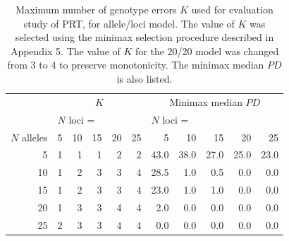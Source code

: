 \documentclass[twoside,10pt,twocolumn]{article}
\begin{document}
\begin{table}
\caption{Maximum number of genotype errors $K$ used for evaluation study of PRT, for allele/loci model. The 
value of $K$ was selected using the minimax selection procedure described in Appendix 5. The value of $K$ 
for the 20/20 model was changed from 3 to 4 to preserve monotonicity. The minimax median $PD$ is also 
listed.}\label{k.table}
\centering
\begin{tabular}{r|rrrrr|rrrrr} \hline
  & \multicolumn{5}{c|}{$K$} & \multicolumn{5}{c}{Minimax median $PD$} \\
 & \multicolumn{5}{l|}{$N$ loci =} & \multicolumn{5}{l}{$N$ loci =} \\
$N$ alleles  & 5 & 10 & 15 & 20 & 25 & 5 & 10 & 15 & 20 & 25 \\ 
  \hline
5 & 1 & 1 & 1 & 2 & 2 & 43.0 & 38.0 & 27.0 & 25.0 & 23.0 \\ 
  10 & 1 & 2 & 3 & 3 & 4 & 28.5 & 1.0 & 0.5 & 0.0 & 0.0 \\ 
  15 & 1 & 2 & 3 & 3 & 4 & 23.0 & 1.0 & 1.0 & 0.0 & 0.0 \\ 
  20 & 1 & 3 & 3 & 4 & 4 & 2.0 & 0.0 & 0.0 & 0.0 & 0.0 \\ 
  25 & 2 & 3 & 3 & 4 & 4 & 0.0 & 0.0 & 0.0 & 0.0 & 0.0 \\ 
   \hline
\end{tabular}
\end{table}



{\footnotesize
}
\end{document}
